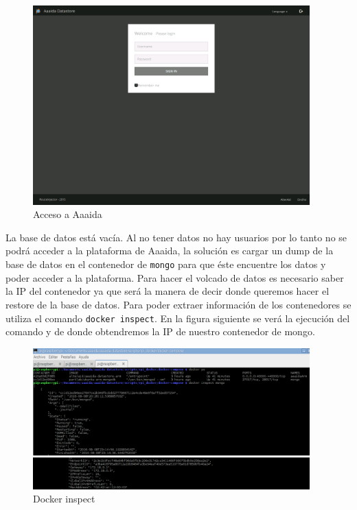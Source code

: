 \begin{figure}[htb]
\begin{center}
\includegraphics[width=0.95\textwidth]{./setup/AaaidaDatastore}
\caption{Acceso a Aaaida}
\label{webLog:LoggeoAaaida}
\end{center}
\end{figure} 

La base de datos está vacía. Al no tener datos no hay usuarios por lo tanto  no se podrá acceder a la plataforma de Aaaida, la solución es cargar un dump de la base de datos en el contenedor de \texttt{mongo} para que éste encuentre los datos y poder acceder a la plataforma.  Para hacer el volcado de datos es necesario saber la IP del contenedor ya que será la manera de decir donde queremos hacer el restore de la base de datos. Para poder extraer información de los contenedores se utiliza el comando \texttt{docker inspect}. En la figura siguiente se verá la ejecución del comando y de donde obtendremos la IP de nuestro contenedor de mongo.
\pagebreak

\begin{figure}[htb]
\begin{center}
\includegraphics[width=0.95\textwidth]{./setup/dockerinspect}
\caption{Docker inspect}
\label{insp:dockerInspect}
\end{center}
\end{figure} 

